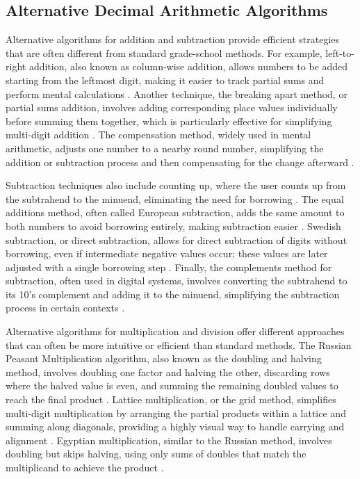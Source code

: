 \subsection{Alternative Decimal Arithmetic Algorithms}
Alternative algorithms for addition and subtraction provide efficient strategies that are often different from standard grade-school methods. For example, left-to-right addition, also known as column-wise addition, allows numbers to be added starting from the leftmost digit, making it easier to track partial sums and perform mental calculations \cite{maharaj2010}. Another technique, the breaking apart method, or partial sums addition, involves adding corresponding place values individually before summing them together, which is particularly effective for simplifying multi-digit addition \cite{ashlock1998}. The compensation method, widely used in mental arithmetic, adjusts one number to a nearby round number, simplifying the addition or subtraction process and then compensating for the change afterward \cite{bobis2004}. 

Subtraction techniques also include counting up, where the user counts up from the subtrahend to the minuend, eliminating the need for borrowing \cite{neill1993}. The equal additions method, often called European subtraction, adds the same amount to both numbers to avoid borrowing entirely, making subtraction easier \cite{martin1992}. Swedish subtraction, or direct subtraction, allows for direct subtraction of digits without borrowing, even if intermediate negative values occur; these values are later adjusted with a single borrowing step \cite{nelson2002}. Finally, the complements method for subtraction, often used in digital systems, involves converting the subtrahend to its 10’s complement and adding it to the minuend, simplifying the subtraction process in certain contexts \cite{niven1991}. 

Alternative algorithms for multiplication and division offer different approaches that can often be more intuitive or efficient than standard methods. The Russian Peasant Multiplication algorithm, also known as the doubling and halving method, involves doubling one factor and halving the other, discarding rows where the halved value is even, and summing the remaining doubled values to reach the final product \cite{ifrah2000}. Lattice multiplication, or the grid method, simplifies multi-digit multiplication by arranging the partial products within a lattice and summing along diagonals, providing a highly visual way to handle carrying and alignment \cite{smith2009}. Egyptian multiplication, similar to the Russian method, involves doubling but skips halving, using only sums of doubles that match the multiplicand to achieve the product \cite{koch1970}. 

